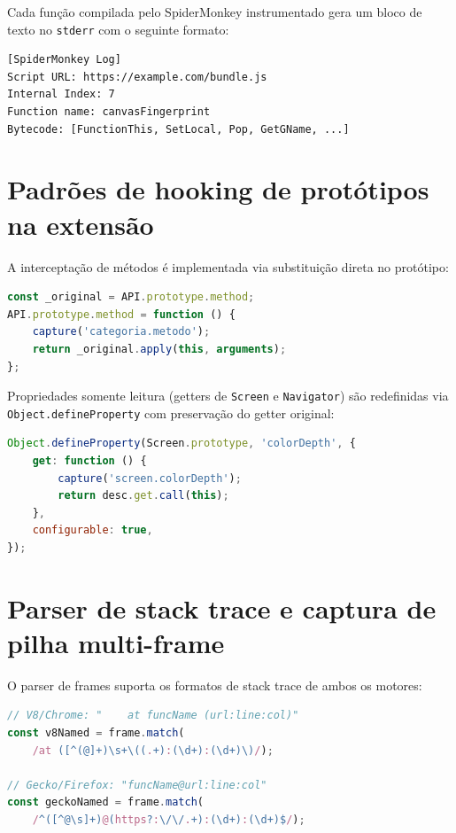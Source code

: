 Cada função compilada pelo SpiderMonkey instrumentado gera um bloco de texto
no \texttt{stderr} com o seguinte formato:

\begin{lstlisting}[language={}]
[SpiderMonkey Log]
Script URL: https://example.com/bundle.js
Internal Index: 7
Function name: canvasFingerprint
Bytecode: [FunctionThis, SetLocal, Pop, GetGName, ...]
\end{lstlisting}

\section{Padrões de hooking de protótipos na extensão}
\label{ap:ext-hook}

A interceptação de métodos é implementada via substituição direta no protótipo:

\begin{lstlisting}[language=JavaScript]
const _original = API.prototype.method;
API.prototype.method = function () {
    capture('categoria.metodo');
    return _original.apply(this, arguments);
};
\end{lstlisting}

Propriedades somente leitura (getters de \texttt{Screen} e \texttt{Navigator})
são redefinidas via \texttt{Object.defineProperty} com preservação do getter
original:

\begin{lstlisting}[language=JavaScript]
Object.defineProperty(Screen.prototype, 'colorDepth', {
    get: function () {
        capture('screen.colorDepth');
        return desc.get.call(this);
    },
    configurable: true,
});
\end{lstlisting}

\section{Parser de stack trace e captura de pilha multi-frame}
\label{ap:ext-stack}

O parser de frames suporta os formatos de stack trace de ambos os motores:

\begin{lstlisting}[language=JavaScript]
// V8/Chrome: "    at funcName (url:line:col)"
const v8Named = frame.match(
    /at ([^(@]+)\s+\((.+):(\d+):(\d+)\)/);

// Gecko/Firefox: "funcName@url:line:col"
const geckoNamed = frame.match(
    /^([^@\s]+)@(https?:\/\/.+):(\d+):(\d+)$/);
\end{lstlisting}

